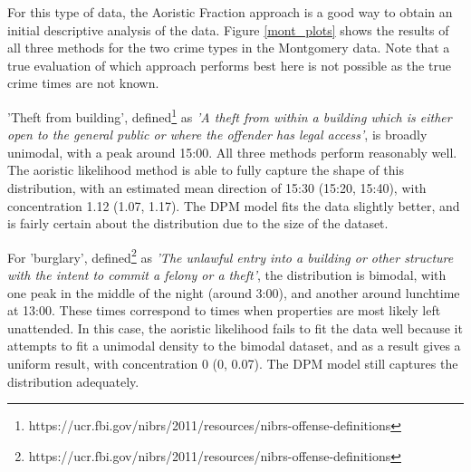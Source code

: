 For this type of data, the Aoristic Fraction approach is a good way to obtain an initial descriptive analysis of the data. Figure \ref{mont_plots} shows the results of all three methods for the two crime types in the Montgomery data. Note that a true evaluation of which approach performs best here is not possible as the true crime times are not known.

'Theft from building', defined\footnote{https://ucr.fbi.gov/nibrs/2011/resources/nibrs-offense-definitions} as \textit{'A theft from within a building which is either open to the general public or where the offender has legal access'}, is broadly unimodal, with a peak around 15:00. All three methods perform reasonably well. The aoristic likelihood method is able to fully capture the shape of this distribution, with an estimated mean direction of 15:30 (15:20, 15:40), with concentration 1.12 (1.07, 1.17). The DPM model fits the data slightly better, and is fairly certain about the distribution due to the size of the dataset.

For 'burglary', defined\footnote{https://ucr.fbi.gov/nibrs/2011/resources/nibrs-offense-definitions} as \textit{'The unlawful entry into a building or other structure with the intent to commit a felony or a theft'}, the distribution is bimodal, with one peak in the middle of the night (around 3:00), and another around lunchtime at 13:00. These times correspond to times when properties are most likely left unattended. In this case, the aoristic likelihood fails to fit the data well because it attempts to fit a unimodal density to the bimodal dataset, and as a result gives a uniform result, with concentration 0 (0, 0.07). The DPM model still captures the distribution adequately.







